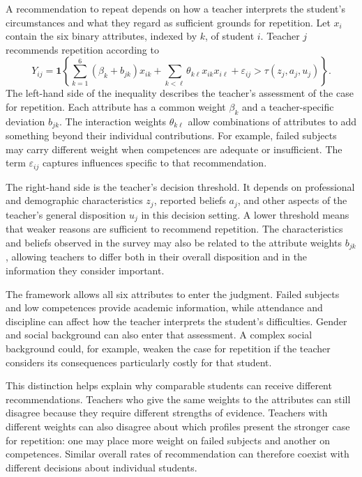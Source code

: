 A recommendation to repeat depends on how a teacher interprets the student's circumstances and what they regard as sufficient grounds for repetition. Let $x_i$ contain the six binary attributes, indexed by $k$, of student $i$. Teacher $j$ recommends repetition according to
\[
Y_{ij}=\mathbf{1}\left\{
\sum_{k=1}^{6}(\beta_k+b_{jk})x_{ik}
+\sum_{k<\ell}\theta_{k\ell}x_{ik}x_{i\ell}
+\varepsilon_{ij}
>\tau(z_j,a_j,u_j)
\right\}.
\]
The left-hand side of the inequality describes the teacher's assessment of the case for repetition. Each attribute has a common weight $\beta_k$ and a teacher-specific deviation $b_{jk}$. The interaction weights $\theta_{k\ell}$ allow combinations of attributes to add something beyond their individual contributions. For example, failed subjects may carry different weight when competences are adequate or insufficient. The term $\varepsilon_{ij}$ captures influences specific to that recommendation.

The right-hand side is the teacher's decision threshold. It depends on professional and demographic characteristics $z_j$, reported beliefs $a_j$, and other aspects of the teacher's general disposition $u_j$ in this decision setting. A lower threshold means that weaker reasons are sufficient to recommend repetition. The characteristics and beliefs observed in the survey may also be related to the attribute weights $b_{jk}$, allowing teachers to differ both in their overall disposition and in the information they consider important.

The framework allows all six attributes to enter the judgment. Failed subjects and low competences provide academic information, while attendance and discipline can affect how the teacher interprets the student's difficulties. Gender and social background can also enter that assessment. A complex social background could, for example, weaken the case for repetition if the teacher considers its consequences particularly costly for that student.

This distinction helps explain why comparable students can receive different recommendations. Teachers who give the same weights to the attributes can still disagree because they require different strengths of evidence. Teachers with different weights can also disagree about which profiles present the stronger case for repetition: one may place more weight on failed subjects and another on competences. Similar overall rates of recommendation can therefore coexist with different decisions about individual students.

